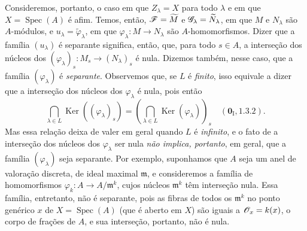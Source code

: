 \begin{env}[11.9.4]
\label{IV.11.9.4}
Consideremos, portanto, o
caso em que
$Z_\lambda=X$ para todo
$\lambda$ e em que
$X=\operatorname{Spec}(A)$
é afim. Temos, então,
$\mathscr{F}=\widetilde M$ e
$\mathscr{G}_\lambda=
\widetilde N_\lambda$,
em que $M$ e $N_\lambda$
são $A$-módulos, e
$u_\lambda=
\widetilde\varphi_\lambda$,
em que
$\varphi_\lambda:
M\to N_\lambda$ são
$A$-homomorfismos.
Dizer que a família
$(u_\lambda)$ é separante
significa, então, que,
para todo $s\in A$, a
interseção dos núcleos
dos
$(\varphi_\lambda)_s:
M_s\to(N_\lambda)_s$
é nula. Dizemos também,
nesse caso, que a família
$(\varphi_\lambda)$ é
\emph{separante}.
Observemos que, se $L$
é \emph{finito}, isso
equivale a dizer que a
interseção dos núcleos
dos $\varphi_\lambda$
é nula, pois então
\[
\bigcap_{\lambda\in L}
\operatorname{Ker}
((\varphi_\lambda)_s)
=\left(
\bigcap_{\lambda\in L}
\operatorname{Ker}
(\varphi_\lambda)
\right)_s
\quad
(\mathbf 0_{\mathrm I},1.3.2).
\]
Mas essa relação deixa
de valer em geral quando
$L$ é \emph{infinito},
e o fato de a interseção
dos núcleos dos
$\varphi_\lambda$ ser
nula \emph{não implica,
portanto},
em geral, que a família
$(\varphi_\lambda)$ seja
separante. Por exemplo,
suponhamos que $A$ seja
um anel de valoração
discreta, de ideal
maximal $\mathfrak m$,
e consideremos a família
de homomorfismos
$\varphi_k:
A\to A/\mathfrak m^k$,
cujos núcleos
$\mathfrak m^k$ têm
interseção nula. Essa
família, entretanto,
não é separante, pois
as fibras de todos os
$\mathfrak m^k$ no
ponto genérico $x$ de
$X=\operatorname{Spec}(A)$
(que é aberto em $X$)
são iguais a
$\mathscr{O}_x=k(x)$, o corpo
de frações de $A$, e sua
interseção, portanto,
não é nula.
\end{env}

